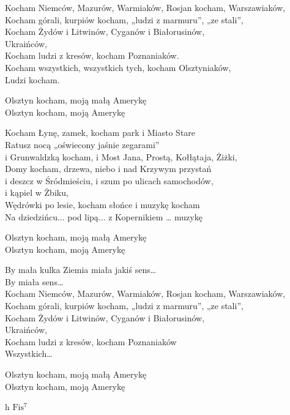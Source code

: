 \begin{text}
    \footnotesize{
    Kocham Niemców, Mazurów, Warmiaków, Rosjan kocham, Warszawiaków,\\
    Kocham górali, kurpiów kocham, „ludzi z marmuru”, „ze stali”,\\
    Kocham Żydów i Litwinów, Cyganów i Białorusinów,\\
    Ukraińców,\\
    Kocham ludzi z kresów, kocham Poznaniaków.\\
    Kocham wszystkich, wszystkich tych, kocham Olsztyniaków,\\
    Ludzi kocham.

    Olsztyn kocham, moją małą Amerykę\\
    Olsztyn kocham, moją Amerykę

    Kocham Łynę, zamek, kocham park i Miasto Stare\\
    Ratusz nocą „oświecony jaśnie zegarami”\\
    i Grunwaldzką kocham, i Most Jana, Prostą, Kołłątaja, Żiżki,\\
    Domy kocham, drzewa, niebo i nad Krzywym przystań\\
    i deszcz w Śródmieściu, i szum po ulicach samochodów,\\
    i kąpiel w Żbiku,\\
    Wędrówki po lesie, kocham słońce i muzykę kocham\\
    Na dziedzińcu... pod lipą... z Kopernikiem … muzykę

    Olsztyn kocham, moją małą Amerykę\\
    Olsztyn kocham, moją Amerykę

    By mała kulka Ziemia miała jakiś sens…\\
    By miała sens…\\
    Kocham Niemców, Mazurów, Warmiaków, Rosjan kocham, Warszawiaków,\\
    Kocham górali, kurpiów kocham, „ludzi z marmuru”, „ze stali”,\\
    Kocham Żydów i Litwinów, Cyganów i Białorusinów,\\
    Ukraińców,\\
    Kocham ludzi z kresów, kocham Poznaniaków\\
    Wszystkich…

    Olsztyn kocham, moją małą Amerykę\\
    Olsztyn kocham, moją Amerykę
    }
\end{text}
\begin{chord}
    \footnotesize{
    h $\mathrm{Fis^7}$
    }
\end{chord}
